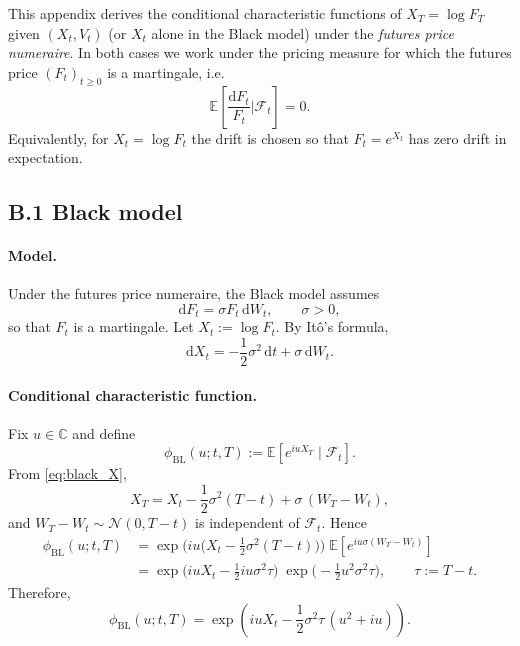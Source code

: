 \documentclass[a4paper,titlepage,12pt]{report}
\theoremstyle{plain}
\begin{document}
This appendix derives the conditional characteristic functions of $X_T=\log F_T$ given $(X_t,V_t)$
(or $X_t$ alone in the Black model) under the \emph{futures price numeraire}. In both cases we work under the pricing measure for which the futures price $(F_t)_{t\ge 0}$ is a martingale, i.e.
\[
\mathbb{E}\!\left[\frac{\mathrm{d}F_t}{F_t}\Big|\mathcal{F}_t\right]=0.
\]
Equivalently, for $X_t=\log F_t$ the drift is chosen so that $F_t=e^{X_t}$ has zero drift in
expectation.

\subsection*{B.1 Black model}
\label{app:black_cf}

\paragraph{Model.}
Under the futures price numeraire, the Black model assumes
\begin{equation}
\mathrm{d}F_t = \sigma F_t\,\mathrm{d}W_t,
\qquad \sigma>0,
\label{eq:black_F}
\end{equation}
so that $F_t$ is a martingale. Let $X_t:=\log F_t$. By It\^{o}'s formula,
\begin{equation}
\mathrm{d}X_t
=
-\frac12\sigma^2\,\mathrm{d}t
+
\sigma\,\mathrm{d}W_t.
\label{eq:black_X}
\end{equation}

\paragraph{Conditional characteristic function.}
Fix $u\in\mathbb{C}$ and define
\[
\phi_{\mathrm{BL}}(u;t,T):=\mathbb{E}\!\left[e^{iuX_T}\mid\mathcal{F}_t\right].
\]
From \eqref{eq:black_X},
\[
X_T
=
X_t
-\frac12\sigma^2(T-t)
+\sigma\,(W_T-W_t),
\]
and $W_T-W_t\sim\mathcal{N}(0,T-t)$ is independent of $\mathcal{F}_t$. Hence
\begin{align}
\phi_{\mathrm{BL}}(u;t,T)
&=
\exp\!\Big(iu\big(X_t-\tfrac12\sigma^2(T-t)\big)\Big)\;
\mathbb{E}\!\left[e^{iu\sigma(W_T-W_t)}\right]
\nonumber\\
&=
\exp\!\Big(iuX_t-\tfrac12 iu\sigma^2\tau\Big)\;
\exp\!\Big(-\tfrac12u^2\sigma^2\tau\Big),
\qquad \tau:=T-t.
\label{eq:black_cf}
\end{align}
Therefore,
\begin{equation}
\boxed{
\phi_{\mathrm{BL}}(u;t,T)
=
\exp\!\left(iuX_t-\frac12\sigma^2\tau\,(u^2+iu)\right).
}
\label{eq:black_cf_boxed}
\end{equation}
\end{document}
